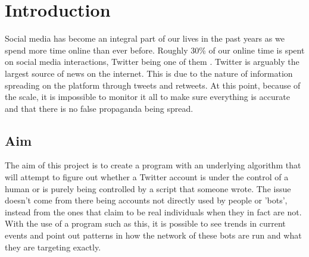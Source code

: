 
\chapter{Introduction} %

\label{Chapter1} %

Social media has become an integral part of our lives in the past years as we spend more time online than ever before. Roughly 30\% of our online time is spent on social media interactions, Twitter being one of them \cite{globalwebindex}.
Twitter is arguably the largest source of news on the internet. This is due to the nature of information spreading on the platform through tweets and retweets. At this point, because of the scale, it is impossible to monitor it all to make sure everything is accurate and that there is no false propaganda being spread. 

\section{Aim}
The aim of this project is to create a program with an underlying algorithm that will attempt to figure out whether a Twitter account is under the control of a human or is purely being controlled by a script that someone wrote. The issue doesn't come from there being accounts not directly used by people or 'bots', instead from the ones that claim to be real individuals when they in fact are not. With the use of a program such as this, it is possible to see trends in current events and point out patterns in how the network of these bots are run and what they are targeting exactly.

